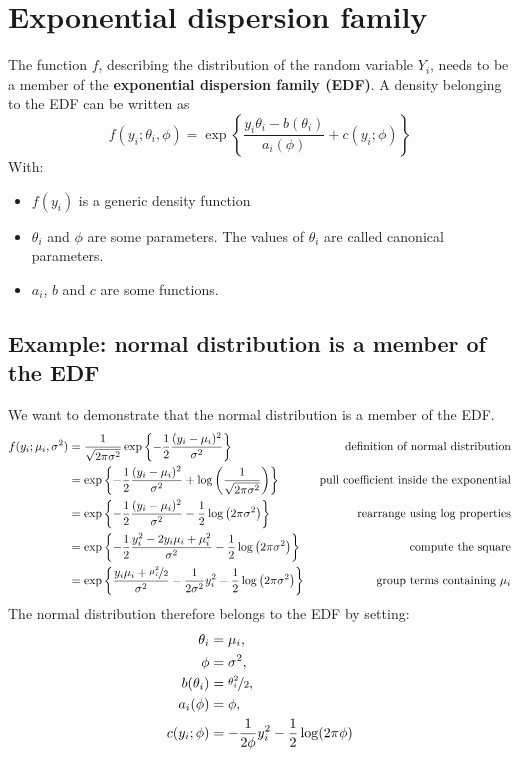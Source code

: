   \section{Exponential dispersion family}
    The function $f$, describing the distribution of the random variable $Y_i$, needs to be a member of the \textbf{exponential dispersion family (EDF)}. A density belonging to the EDF can be written as
    $$f(y_i;\theta_i,\phi)=\exp\left\{\frac{y_i\theta_i-b(\theta_i)}{a_i(\phi)}+c(y_i;\phi)\right\}$$
    With:
    \begin{itemize}
      \item $f(y_i)$ is a generic density function 
      \item $\theta_i$ and $\phi$ are some parameters. The values of $\theta_i$ are called canonical parameters.
      \item $a_i$, $b$ and $c$ are some functions.
    \end{itemize}

    \subsection{Example: normal distribution is a member of the EDF}
      We want to demonstrate that the normal distribution is a member of the EDF.
      \begin{align*}
      f(y_i; \mu_i, \sigma^2)
        &= \frac{1}{\sqrt{2\pi\sigma^2}} \exp\left\{-\frac{1}{2} \frac{(y_i-\mu_i)^2}{\sigma^2}\right\}
        & \text{ definition of normal distribution}\\
        &= \exp\left\{-\frac{1}{2} \frac{(y_i-\mu_i)^2}{\sigma^2} + \log\left(\frac{1}{\sqrt{2\pi\sigma^2}}\right)\right\}
        & \text{ pull coefficient inside the exponential}\\
        &= \exp\left\{-\frac{1}{2} \frac{(y_i-\mu_i)^2}{\sigma^2} -\frac{1}{2}\log\left(2\pi\sigma^2\right)\right\}
        & \text{ rearrange using log properties}\\
        &= \exp\left\{-\frac{1}{2} \frac{y_i^2-2y_i\mu_i+\mu_i^2}{\sigma^2} -\frac{1}{2}\log\left(2\pi\sigma^2\right)\right\}
        & \text{ compute the square}\\
        &= \exp\left\{\frac{y_i\mu_i+\nicefrac{\mu_i^2}{2}}{\sigma^2} - \frac{1}{2\sigma^2}y_i^2 - \frac{1}{2}\log\left(2\pi\sigma^2\right)\right\}
        & \text{ group terms containing } \mu_i\\
      \end{align*}
      The normal distribution therefore belongs to the EDF by setting:
      \begin{align*}
        \theta_i     &= \mu_i, \\
        \phi         &= \sigma^2, \\
        b(\theta_i)  &= \nicefrac{\theta_i^2}{2}, \\
        a_i(\phi)    &= \phi, \\
        c(y_i; \phi) &= - \frac{1}{2\phi} y_i^2 - \frac{1}{2}\log(2\pi\phi)
      \end{align*}

